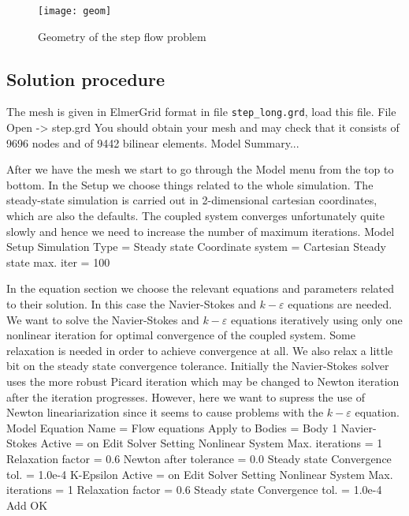 \begin{figure}[h]
\centering
\texttt{[image: geom]}
\caption{Geometry of the step flow problem}\label{fg:struct2b}
\end{figure}
%


\subsection*{Solution procedure}

The mesh is given in ElmerGrid format in file \texttt{step\_long.grd}, load this file.
\ttbegin
File 
  Open -> step.grd
\ttend
You should obtain your mesh and may check that it consists of 9696 nodes and of 
9442 bilinear elements.
\ttbegin
Model 
  Summary...
\ttend

After we have the mesh we start to go through the Model menu from the top to bottom. 
In the Setup we choose things related to the whole simulation.
The steady-state simulation is carried out in 2-dimensional cartesian
coordinates, which are also the defaults.  
The coupled system converges unfortunately quite slowly and hence we need to increase the number of maximum 
iterations. 
\ttbegin
Model
  Setup 
    Simulation Type = Steady state
    Coordinate system = Cartesian
    Steady state max. iter = 100
\ttend

In the equation section we choose the relevant equations and 
parameters related to their solution. 
In this case the Navier-Stokes and $k-\varepsilon$ equations are needed.
We want to solve the Navier-Stokes and $k-\varepsilon$ equations iteratively using only one nonlinear iteration
for optimal convergence of the coupled system. Some relaxation is needed in order to achieve convergence 
at all. We also relax a little bit on the steady state convergence tolerance. 
Initially the Navier-Stokes
solver uses the more robust Picard iteration which may be changed to Newton iteration after the iteration 
progresses. However, here we want to supress the use of Newton lineariarization since it seems to
cause problems with the $k-\varepsilon$ equation.
\ttbegin
Model
  Equation
    Name = Flow equations
    Apply to Bodies = Body 1
    Navier-Stokes 
      Active = on
      Edit Solver Setting
        Nonlinear System
          Max. iterations = 1
          Relaxation factor = 0.6
          Newton after tolerance = 0.0
        Steady state
          Convergence tol. = 1.0e-4
    K-Epsilon 
      Active = on
      Edit Solver Setting
        Nonlinear System
          Max. iterations = 1
          Relaxation factor = 0.6
        Steady state
          Convergence tol. = 1.0e-4
    Add 
    OK
\ttend        

